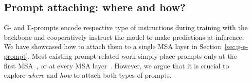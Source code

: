 \documentclass[runningheads]{llncs}
\newcommand{\zifeng}[1]{\textcolor{red}{Zifeng: #1}}
\newcommand{\combiner}{PAF\xspace}
\begin{document}

\subsection{Prompt attaching: where and how?}\label{sec:combiner}
G- and E-prompts encode respective type of instructions during training with the backbone and cooperatively instruct the model to make predictions at inference. We have showcased how to attach them to a single MSA layer in Section~\ref{sec:g-e-prompt}. Most existing prompt-related work simply place prompts only at the first MSA~\cite{wang2021learning,lester2021power}, or at every MSA layer~\cite{li2021prefix,liu2021p}. However,
we argue that it is crucial to explore \emph{where} and \emph{how} to attach both types of prompts. %

\end{document}
